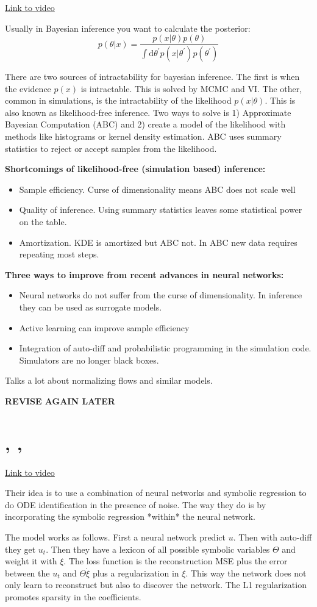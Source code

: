 \documentclass{article}
\newcommand{\citeall}[1]{\citeauthor{#1}, \citetitle{#1}, \citeyear{#1}}
\newcommand{\uls}{\begin{itemize}}
\newcommand{\ule}{\end{itemize}}
\newcommand{\li}{\item}
\begin{document}
\href{https://www.youtube.com/watch?v=odAQlcf5Urc}{Link to video}

Usually in Bayesian inference you want to calculate the posterior:
$$
p(\theta | x)=\frac{p(x | \theta) p(\theta)}{\int \mathrm{d} \theta^{\prime} p\left(x | \theta^{\prime}\right) p\left(\theta^{\prime}\right)}
$$

There are two sources of intractability for bayesian inference. The first is when the evidence $p(x)$ is intractable. This is solved by MCMC and VI. The other, common in simulations, is the intractability of the likelihood $p(x|\theta)$. This is also known as likelihood-free inference. Two ways to solve is 1) Approximate Bayesian Computation (ABC) and 2) create a model of the likelihood with methods like histograms or kernel density estimation. ABC uses summary statistics to reject or accept samples from the likelihood.

\textbf{Shortcomings of likelihood-free (simulation based) inference:
}\uls
\li Sample efficiency. Curse of dimensionality means ABC does not scale well
\li Quality of inference. Using summary statistics leaves some statistical power on the table.
\li Amortization. KDE is amortized but ABC not. In ABC new data requires repeating most steps. 
\ule

\textbf{Three ways to improve from recent advances in neural networks:
}
\uls
\li Neural networks do not suffer from the curse of dimensionality. In inference they can be used as surrogate models.
\li Active learning can improve sample efficiency
\li Integration of auto-diff and probabilistic programming in the simulation code. Simulators are no longer black boxes.
\ule

Talks a lot about normalizing flows and similar models.

\textbf{REVISE AGAIN LATER}

\section{\citeall{Both2019DeepMoD:Data}}

\href{https://www.youtube.com/watch?v=Ml4EXS_MUBc}{Link to video}

Their idea is to use a combination of neural networks and symbolic regression to do ODE identification in the presence of noise. The way they do is by incorporating the symbolic regression *within* the neural network. 

The model works as follows. First a neural network predict $u$. Then with auto-diff they get $u_t$. Then they have a lexicon of all possible symbolic variables $\Theta$ and weight it with $\xi$. The loss function is the reconstruction MSE plus the error between the $u_t$ and $\Theta \dot \xi$ plus a regularization in $\xi$. This way the network does not only learn to reconstruct but also to discover the network. The L1 regularization promotes sparsity in the coefficients. 
\end{document}
